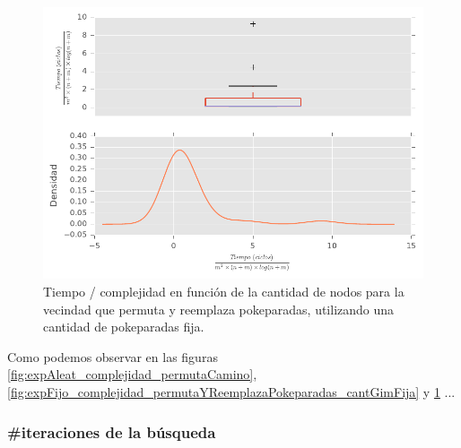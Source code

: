 \begin{figure}[H]
  \begin{center}
    \includegraphics{../experimentacion/ej3/expFijo_complejidad_permutaYReemplazaPokeparadas_cantPokFija.pdf}
    \caption{Tiempo / complejidad en funci\'on de la cantidad de nodos para la vecindad que permuta y reemplaza pokeparadas, utilizando una cantidad de pokeparadas fija.}
    \label{fig:expFijo_complejidad_permutaYReemplazaPokeparadas_cantPokFija}
  \end{center}
\end{figure}

Como podemos observar en las figuras \ref{fig:expAleat_complejidad_permutaCamino}, \ref{fig:expFijo_complejidad_permutaYReemplazaPokeparadas_cantGimFija} y \ref{fig:expFijo_complejidad_permutaYReemplazaPokeparadas_cantPokFija} ...

\subsubsection{\#iteraciones de la b\'usqueda}

